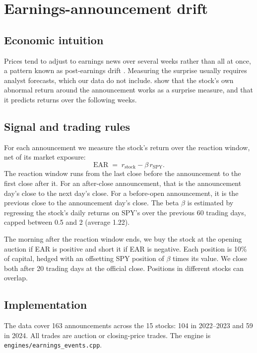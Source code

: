 \documentclass[../main.tex]{subfiles}
\begin{document}
\section{Earnings-announcement drift}\label{sec:drift}

\subsection{Economic intuition}
Prices tend to adjust to earnings news over several weeks rather than all at once, a pattern known as post-earnings drift \citep{chan1996}. Measuring the surprise usually requires analyst forecasts, which our data do not include. \citet{brandt2008} show that the stock's own abnormal return around the announcement works as a surprise measure, and that it predicts returns over the following weeks.

\subsection{Signal and trading rules}
For each announcement we measure the stock's return over the reaction window, net of its market exposure:
\begin{equation}
  \text{EAR} \;=\; r_{\text{stock}} - \beta\, r_{\text{SPY}} .
\end{equation}
The reaction window runs from the last close before the announcement to the first close after it. For an after-close announcement, that is the announcement day's close to the next day's close. For a before-open announcement, it is the previous close to the announcement day's close. The beta $\beta$ is estimated by regressing the stock's daily returns on SPY's over the previous 60 trading days, capped between 0.5 and 2 (average 1.22).

The morning after the reaction window ends, we buy the stock at the opening auction if EAR is positive and short it if EAR is negative. Each position is 10\% of capital, hedged with an offsetting SPY position of $\beta$ times its value. We close both after 20 trading days at the official close. Positions in different stocks can overlap.

\subsection{Implementation}
The data cover 163 announcements across the 15 stocks: 104 in 2022--2023 and 59 in 2024. All trades are auction or closing-price trades. The engine is \texttt{engines/earnings\_events.cpp}.
\end{document}
